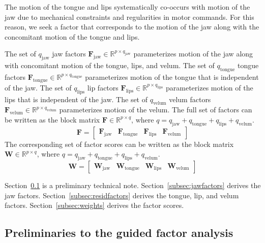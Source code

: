 \documentclass[reprint]{JASAnew}\usepackage[]{graphicx}\usepackage[]{color}
\begin{document}
The motion of the tongue and lips systematically co-occurs with motion of the jaw due to mechanical constraints and regularities in motor commands. For this reason, we seek a factor that corresponds to the motion of the jaw along with the concomitant motion of the tongue and lips.


The set of $q_\text{jaw}$ jaw factors $\mathbf{F}_\text{jaw} \in \mathbb{R}^{p\times q_\text{jaw}}$ parameterizes motion of the jaw along with concomitant motion of the tongue, lips, and velum.
%
The set of $q_\text{tongue}$ tongue factors $\mathbf{F}_\text{tongue} \in \mathbb{R}^{p\times q_\text{tongue}}$ parameterizes motion of the tongue that is independent of the jaw. 
%
The set of $q_\text{lips}$ lip factors $\mathbf{F}_\text{lips} \in \mathbb{R}^{p\times q_\text{lips}}$ parameterizes motion of the lips that is independent of the jaw.
%
The set of $q_\text{velum}$ velum factors $\mathbf{F}_\text{velum} \in \mathbb{R}^{p\times q_\text{velum}}$ parameterizes motion of the velum.
%
The full set of factors can be written as the block matrix $\mathbf{F} \in \mathbb{R}^{p\times q}$, where $q=q_\text{jaw}+q_\text{tongue}+q_\text{lips}+q_\text{velum}$. 
% 
\begin{equation}
\label{eq:Fblock}
\mathbf{F} = 
\left[
\begin{array}{c|c|c|c}
\mathbf{F}_\text{jaw} 
& \mathbf{F}_\text{tongue}
& \mathbf{F}_\text{lips}
& \mathbf{F}_\text{velum}
\end{array}
\right]
\end{equation}
%
The corresponding set of factor scores can be written as the block matrix $\mathbf{W} \in \mathbb{R}^{p\times q}$, where $q=q_\text{jaw}+q_\text{tongue}+q_\text{lips}+q_\text{velum}$. 
% 
\begin{equation}
\label{eq:Wblock}
\mathbf{W} = 
\left[
\begin{array}{c|c|c|c}
\mathbf{W}_\text{jaw} 
& \mathbf{W}_\text{tongue}
& \mathbf{W}_\text{lips}
& \mathbf{W}_\text{velum}
\end{array}
\right]
\end{equation}

Section~\ref{subsec:preliminaries} is a preliminary technical note. Section~\ref{subsec:jawfactors} derives the jaw factors. Section~\ref{subsec:residfactors} derives the tongue, lip, and velum factors. Section~\ref{subsec:weights} derives the factor scores. 





\subsection{Preliminaries to the guided factor analysis}
\label{subsec:preliminaries}
\end{document}

